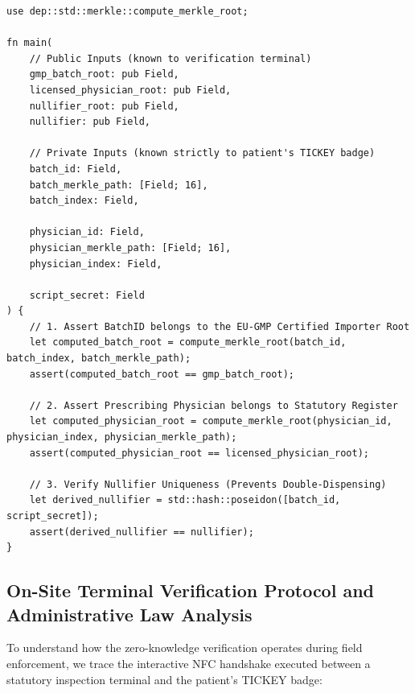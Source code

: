 \documentclass[a4paper,11pt,twoside,parskip=half-,headings=small]{scrartcl}
\newcommand{\code}[1]{\texttt{#1}}
\begin{document}
\begin{lstlisting}[language=Noir,caption={Noir Circuit: zkCompliance Association-Set Prescriber and Batch Verifier (\code{circuits/src/zk\_compliance.nr})}]
use dep::std::merkle::compute_merkle_root;

fn main(
    // Public Inputs (known to verification terminal)
    gmp_batch_root: pub Field,
    licensed_physician_root: pub Field,
    nullifier_root: pub Field,
    nullifier: pub Field,
    
    // Private Inputs (known strictly to patient's TICKEY badge)
    batch_id: Field,
    batch_merkle_path: [Field; 16],
    batch_index: Field,
    
    physician_id: Field,
    physician_merkle_path: [Field; 16],
    physician_index: Field,
    
    script_secret: Field
) {
    // 1. Assert BatchID belongs to the EU-GMP Certified Importer Root
    let computed_batch_root = compute_merkle_root(batch_id, batch_index, batch_merkle_path);
    assert(computed_batch_root == gmp_batch_root);

    // 2. Assert Prescribing Physician belongs to Statutory Register
    let computed_physician_root = compute_merkle_root(physician_id, physician_index, physician_merkle_path);
    assert(computed_physician_root == licensed_physician_root);

    // 3. Verify Nullifier Uniqueness (Prevents Double-Dispensing)
    let derived_nullifier = std::hash::poseidon([batch_id, script_secret]);
    assert(derived_nullifier == nullifier);
}
\end{lstlisting}

\subsection{On-Site Terminal Verification Protocol and Administrative Law Analysis}
\label{sec:onsite_verification_flow}

To understand how the zero-knowledge verification operates during field enforcement, we trace the interactive NFC handshake executed between a statutory inspection terminal and the patient's TICKEY badge:
\end{document}

